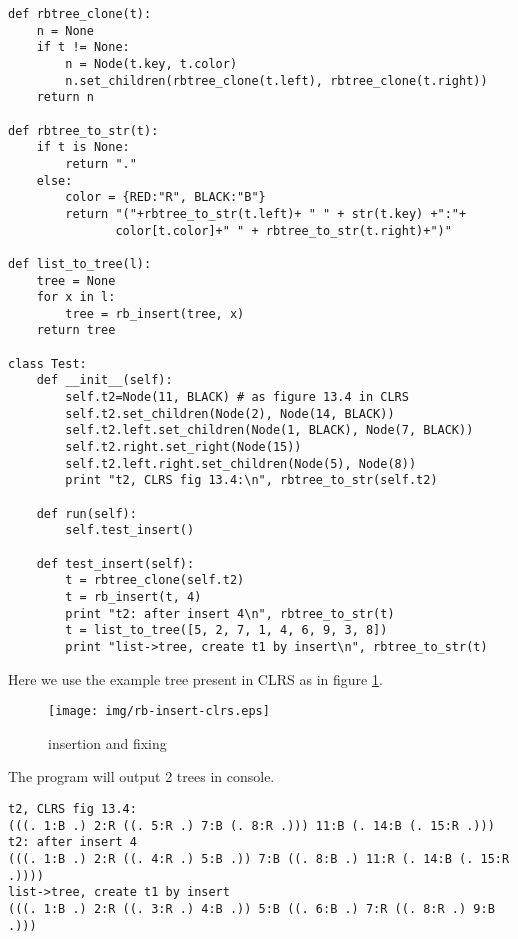 \documentclass{article}
\begin{document}
\begin{lstlisting}
def rbtree_clone(t):
    n = None
    if t != None:
        n = Node(t.key, t.color)
        n.set_children(rbtree_clone(t.left), rbtree_clone(t.right))
    return n

def rbtree_to_str(t):
    if t is None:
        return "."
    else:
        color = {RED:"R", BLACK:"B"}
        return "("+rbtree_to_str(t.left)+ " " + str(t.key) +":"+
               color[t.color]+" " + rbtree_to_str(t.right)+")"

def list_to_tree(l):
    tree = None
    for x in l:
        tree = rb_insert(tree, x)
    return tree

class Test:
    def __init__(self):
        self.t2=Node(11, BLACK) # as figure 13.4 in CLRS
        self.t2.set_children(Node(2), Node(14, BLACK))
        self.t2.left.set_children(Node(1, BLACK), Node(7, BLACK))
        self.t2.right.set_right(Node(15))
        self.t2.left.right.set_children(Node(5), Node(8))
        print "t2, CLRS fig 13.4:\n", rbtree_to_str(self.t2)

    def run(self):
        self.test_insert()

    def test_insert(self):
        t = rbtree_clone(self.t2)
        t = rb_insert(t, 4)
        print "t2: after insert 4\n", rbtree_to_str(t)
        t = list_to_tree([5, 2, 7, 1, 4, 6, 9, 3, 8])
        print "list->tree, create t1 by insert\n", rbtree_to_str(t)
\end{lstlisting}

Here we use the example tree present in CLRS as in figure \ref{fig:rb-insert-clrs}.

\begin{figure}[htbp]
       \begin{center}
	\texttt{[image: img/rb-insert-clrs.eps]}
        \caption{insertion and fixing} \label{fig:rb-insert-clrs}
       \end{center}
\end{figure}

The program will output 2 trees in console.

\begin{verbatim}
t2, CLRS fig 13.4:
(((. 1:B .) 2:R ((. 5:R .) 7:B (. 8:R .))) 11:B (. 14:B (. 15:R .)))
t2: after insert 4
(((. 1:B .) 2:R ((. 4:R .) 5:B .)) 7:B ((. 8:B .) 11:R (. 14:B (. 15:R .))))
list->tree, create t1 by insert
(((. 1:B .) 2:R ((. 3:R .) 4:B .)) 5:B ((. 6:B .) 7:R ((. 8:R .) 9:B .)))
\end{verbatim}
\end{document}
